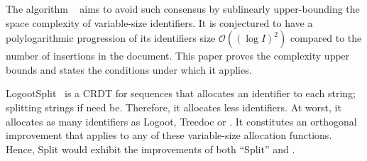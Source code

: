 \noindent The algorithm \LSEQ~\cite{nedelec2013lseq} aims to avoid such
consensus by sublinearly upper-bounding the space complexity of variable-size
identifiers. It is conjectured to have a polylogarithmic progression of its
identifiers size $\mathcal{O}((\log I)^2)$ compared to the number of insertions
in the document. This paper proves the complexity upper bounds and states the
conditions under which it applies.

LogootSplit~\cite{andre2013supporting} is a CRDT for sequences that allocates an
identifier to each string; splitting strings if need be. Therefore, it allocates
less identifiers. At worst, it allocates as many identifiers as Logoot, Treedoc
or \LSEQ. It constitutes an orthogonal improvement that applies to any of these
variable-size allocation functions. Hence, \LSEQ{}Split would exhibit the
improvements of both ``Split'' and \LSEQ.



